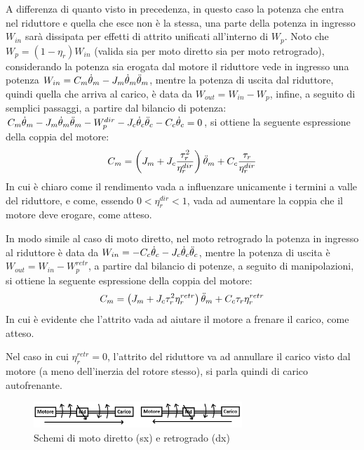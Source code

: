A differenza di quanto visto in precedenza, in questo caso la potenza che entra nel riduttore e quella che esce non è la stessa, una parte della potenza in ingresso $W_{in}$ sarà dissipata per effetti di attrito unificati all'interno di $W_p$. 
Noto che $W_p=(1-\eta_r) W_{in}$ (valida sia per moto diretto sia per moto retrogrado), considerando la potenza sia erogata dal motore il riduttore vede in ingresso una potenza $W_{in}=C_m \dot{\theta}_m - J_m \dot{\theta}_m \Ddot{\theta}_m$, mentre la potenza di uscita dal riduttore, quindi quella che arriva al carico, è data da $W_{out}=W_{in}-W_p$, infine, a seguito di semplici passaggi, a partire dal bilancio di potenza: $C_m \dot{\theta}_m - J_m \dot{\theta}_m \Ddot{\theta}_m - W_p^{dir} - J_c \dot{\theta}_c \Ddot{\theta}_c - C_c \dot{\theta}_c = 0$, si ottiene la seguente espressione della coppia del motore:
\[ C_m = \left(J_m+J_c\frac{\tau^2_r}{\eta_r^{dir}}\right) \Ddot{\theta}_m + C_c\frac{\tau_r}{\eta_r^{dir}} \]
In cui è chiaro come il rendimento vada a influenzare unicamente i termini a valle del riduttore, e come, essendo $0<\eta_r^{dir}<1$, vada ad aumentare la coppia che il motore deve erogare, come atteso.

In modo simile al caso di moto diretto, nel moto retrogrado la potenza in ingresso al riduttore è data da $W_{in}=-C_c\dot{\theta}_c - J_c \dot{\theta}_c \Ddot{\theta}_c$, mentre la potenza di uscita è $W_{out}=W_{in}-W_p^{retr}$, a partire dal bilancio di potenze, a seguito di manipolazioni, si ottiene la seguente espressione della coppia del motore:
\[ C_m = \left(J_m + J_c \tau_r^2\eta_r^{retr} \right)\Ddot{\theta}_m + C_c\tau_r \eta_r^{retr} \]
In cui è evidente che l'attrito vada ad aiutare il motore a frenare il carico, come atteso.

Nel caso in cui $\eta_r^{retr}=0$, l'attrito del riduttore va ad annullare il carico visto dal motore (a meno dell'inerzia del rotore stesso), si parla quindi di carico autofrenante.

\begin{figure}[h]
    \centering
    \includegraphics[width=0.7\textwidth]{Immagini/mrc_moti_diretti_vs_retrogrado.png}
    \caption{Schemi di moto diretto (sx) e retrogrado (dx)}
\end{figure}

